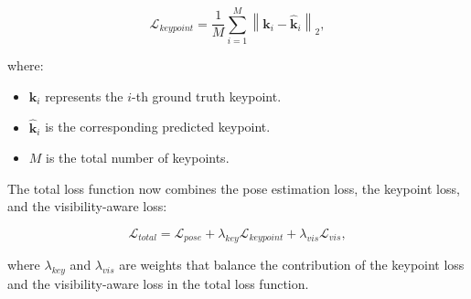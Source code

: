 \begin{equation}
\mathcal{L}_{keypoint} = \frac{1}{M} \sum_{i=1}^{M} \left\| \mathbf{k}_i - \hat{\mathbf{k}}_i \right\|_2,
\end{equation}

\noindent where:

\begin{itemize}
    \item $\mathbf{k}_i$ represents the $i$-th ground truth keypoint.
    \item $\hat{\mathbf{k}}_i$ is the corresponding predicted keypoint.
    \item $M$ is the total number of keypoints.
\end{itemize}

\noindent The total loss function now combines the pose estimation loss, the keypoint loss, and the visibility-aware loss:

\begin{equation}
\mathcal{L}_{total} = \mathcal{L}_{pose} + \lambda_{key} \mathcal{L}_{keypoint} + \lambda_{vis} \mathcal{L}_{vis},
\end{equation}

\noindent where $\lambda_{key}$ and $\lambda_{vis}$ are weights that balance the contribution of the keypoint loss and the visibility-aware loss in the total loss function.
